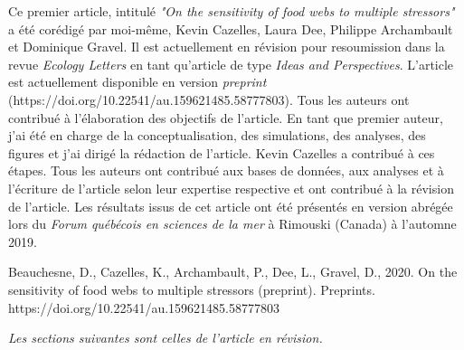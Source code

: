 Ce premier article, intitulé \textit{"On the sensitivity of food webs to multiple stressors"} a été corédigé par moi-même, Kevin Cazelles, Laura Dee, Philippe Archambault et Dominique Gravel. Il est actuellement en révision pour resoumission dans la revue \textit{Ecology Letters} en tant qu'article de type \textit{Ideas and Perspectives}. L'article est actuellement disponible en version \textit{preprint} (https://doi.org/10.22541/au.159621485.58777803). Tous les auteurs ont contribué à l'élaboration des objectifs de l'article. En tant que premier auteur, j'ai été en charge de la conceptualisation, des simulations, des analyses, des figures et j'ai dirigé la rédaction de l'article. Kevin Cazelles a contribué à ces étapes. Tous les auteurs ont contribué aux bases de données, aux analyses et à l'écriture de l'article selon leur expertise respective et ont contribué à la révision de l'article. Les résultats issus de cet article ont été présentés en version abrégée lors du \textit{Forum québécois en sciences de la mer} à Rimouski (Canada) à l'automne 2019. \linebreak[4]

\begin{singlespace}
Beauchesne, D., Cazelles, K., Archambault, P., Dee, L., Gravel, D., 2020. On the sensitivity of food webs to multiple stressors (preprint). Preprints. https://doi.org/10.22541/au.159621485.58777803
\end{singlespace}

\textit{Les sections suivantes sont celles de l’article en révision.}
